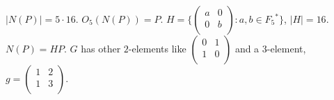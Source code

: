 $|N(P)| = 5 \cdot 16$. $O_5(N(P))=P$.
$H = \{
\left(
\begin{array}{cc}
a &  0 \\
0 &  b\\
\end{array}
\right) : a, b \in {F_5}^* \}$, $|H|=16$.  $N(P)=HP$.  $G$ has other $2$-elements like
$
\left(
\begin{array}{cc}
0 &  1 \\
1 &  0\\
\end{array}
\right)
$ and a $3$-element,
$g=
\left(
\begin{array}{cc}
1 &  2 \\
1 &  3\\
\end{array}
\right)
$.

